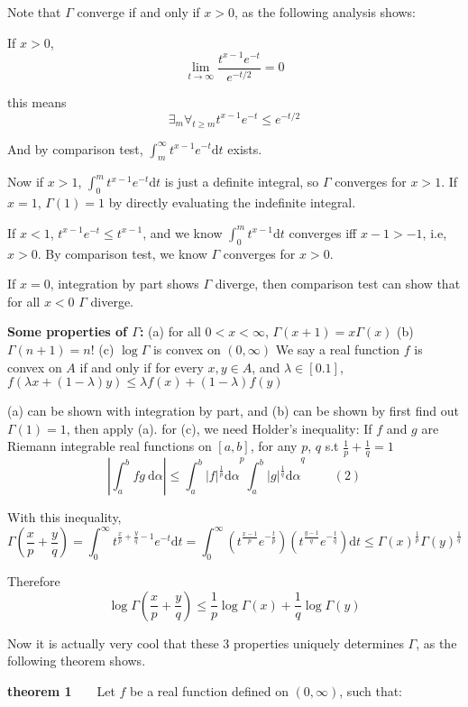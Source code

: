 \documentclass[a4paper,12pt]{article}
\begin{document}
Note that $\Gamma$ converge if and only if $x>0$, as the following analysis shows: 

If $x>0$,  $$\lim_{t\rightarrow\infty} \frac{t^{x-1}e^{-t}}{e^{-t/2}} = 0$$

this means $$ \exists_m \forall_{t\geq m}  t^{x-1}e^{-t} \leq {e^{-t/2}} $$

And by comparison test, $\int_m^{\infty} t^{x-1}e^{-t} \mathrm{d}t$ exists.

Now if $x > 1$,  $\int_0^m t^{x-1}e^{-t} \mathrm{d}t$ is just a definite integral, so $\Gamma$ converges for $x>1$. If $x=1$, $\Gamma(1) = 1$ by directly evaluating the indefinite integral.

If $x<1$, $t^{x-1}e^{-t} \leq t^{x-1}$, and we know $\int_0^m t^{x-1} \mathrm{d}t$ converges iff $x-1>-1$, i.e, $x>0$. By comparison test, we know $\Gamma$ converges for $x>0$.

If $x=0$, integration by part shows $\Gamma$ diverge, then comparison test can show that for all $x<0$ $\Gamma$ diverge. 

\textbf{Some properties of $\Gamma$:} 
(a) for all $0<x<\infty$, $\Gamma(x+1) = x\Gamma(x)$  
(b) $\Gamma(n+1) = n!$ 
(c) $\log \Gamma$ is convex on $(0, \infty)$ 
We say a real function $f$ is convex on $A$ if and only if for every $x, y\in A$, and $\lambda \in [0.1]$, $f(\lambda x + (1-\lambda)y) \leq \lambda f(x) + (1-\lambda)f(y)$ 

(a) can be shown with integration by part, and (b) can be shown by first find out $\Gamma(1)=1$, then apply (a). for (c), we need Holder's inequality:
{\center}
If $f$ and $g$ are Riemann integrable real functions on $[a, b]$, for any $p$, $q$ s.t $\frac{1}{p} + \frac{1}{q} = 1$
$$|\int_a^b fg\ \mathrm{d}\alpha| \leq {\int_a^b |f|^{\frac{1}{p}}\mathrm{d}\alpha}^p {\int_a^b |g|^{\frac{1}{q}}\mathrm{d}\alpha}^q\ \ \ \ \ \ \ \ \ \ (2) $$
{\center}

With this inequality, 
$$\Gamma(\frac{x}{p} + \frac{y}{q}) = 
\int_0^\infty t^{\frac{x}{p} + \frac{y}{q} - 1}e^{-t} \mathrm{d}t = 
\int_0^\infty (t^\frac{x-1}{p}e^{-\frac{t}{p}}) (t^\frac{y-1}{q}e^{-\frac{t}{q}}) \mathrm{d}t \leq \Gamma(x) ^ {\frac{1}{p}} \Gamma(y) ^ {\frac{1}{q}}$$

Therefore
$$\log\Gamma( \frac{x}{p} + \frac{y}{q} ) \leq \frac{1}{p}\log\Gamma(x)+ \frac{1}{q}\log\Gamma(y)$$ 

Now it is actually very cool that these 3 properties uniquely determines $\Gamma$, as the following theorem shows. 

\textbf{theorem 1}\ \ \ \ 
Let $f$ be a real function defined  on $(0, \infty)$, such that:
\end{document}
